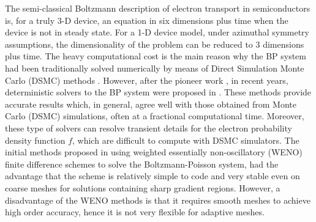 \documentclass[11pt]{article}
\begin{document}
The semi-classical Boltzmann description of electron transport in semiconductors is, for a truly 3-D 
device, an equation in six dimensions plus time when the device is not in steady state. For a 1-D 
device model, under azimuthal symmetry assumptions, the dimensionality of the problem can be reduced to 3 
dimensions plus time. The  heavy computational cost is the main reason why the BP system had been 
traditionally solved numerically by means of Direct Simulation Monte Carlo (DSMC) methods 
\cite{jaco89}. However, after the pioneer work \cite{Fatemi_1993_JCP_Boltz}, in recent years, 
deterministic solvers to the BP system were proposed in 
\cite{MP, carr02, cgms03, carr03, carr021, cgms06, gm07, galler-re}. 
These methods provide accurate results which, in general, agree well with those obtained from Monte 
Carlo (DSMC) simulations, often at a fractional computational time.  Moreover, these type of solvers can resolve 
transient details for the electron probability density function $f$, which are 
difficult to compute with DSMC simulators. 
%
The initial methods proposed in \cite{cgms03, carr03, carr021, cgms06} using weighted essentially non-oscillatory (WENO) finite 
difference schemes to solve the Boltzmann-Poisson system, had the advantage that the scheme is relatively simple to code and very stable even on coarse meshes for solutions containing sharp 
gradient regions. However, a disadvantage of the WENO methods is that it requires smooth meshes to achieve high order accuracy, hence it is not very flexible for adaptive meshes.
\end{document}

